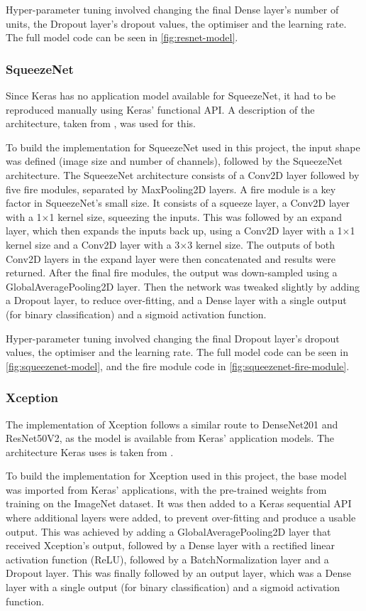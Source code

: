 Hyper-parameter tuning involved changing the final Dense layer's number of units, the Dropout layer's dropout values, the optimiser and the learning rate. The full model code can be seen in \autoref{fig:resnet-model}.

\subsubsection{SqueezeNet}
Since Keras has no application model available for SqueezeNet, it had to be reproduced manually using Keras' functional API. A description of the architecture, taken from \cite{iandola2016squeezenet}, was used for this.

To build the implementation for SqueezeNet used in this project, the input shape was defined (image size and number of channels), followed by the SqueezeNet architecture. The SqueezeNet architecture consists of a Conv2D layer followed by five fire modules, separated by MaxPooling2D layers. A fire module is a key factor in SqueezeNet's small size. It consists of a squeeze layer, a Conv2D layer with a 1$\times$1 kernel size, squeezing the inputs. This was followed by an expand layer, which then expands the inputs back up, using a Conv2D layer with a 1$\times$1 kernel size and a Conv2D layer with a 3$\times$3 kernel size. The outputs of both Conv2D layers in the expand layer were then concatenated and results were returned. After the final fire modules, the output was down-sampled using a GlobalAveragePooling2D layer. Then the network was tweaked slightly by adding a Dropout layer, to reduce over-fitting, and a Dense layer with a single output (for binary classification) and a sigmoid activation function.

Hyper-parameter tuning involved changing the final Dropout layer's dropout values, the optimiser and the learning rate. The full model code can be seen in \autoref{fig:squeezenet-model}, and the fire module code in \autoref{fig:squeezenet-fire-module}.

\subsubsection{Xception}
The implementation of Xception follows a similar route to DenseNet201 and ResNet50V2, as the model is available from Keras' application models. The architecture Keras uses is taken from \cite{chollet2017xception}.

To build the implementation for Xception used in this project, the base model was imported from Keras' applications, with the pre-trained weights from training on the ImageNet dataset. It was then added to a Keras sequential API where additional layers were added, to prevent over-fitting and produce a usable output. This was achieved by adding a GlobalAveragePooling2D layer that received Xception's output, followed by a Dense layer with a rectified linear activation function (ReLU), followed by a BatchNormalization layer and a Dropout layer. This was finally followed by an output layer, which was a Dense layer with a single output (for binary classification) and a sigmoid activation function.

